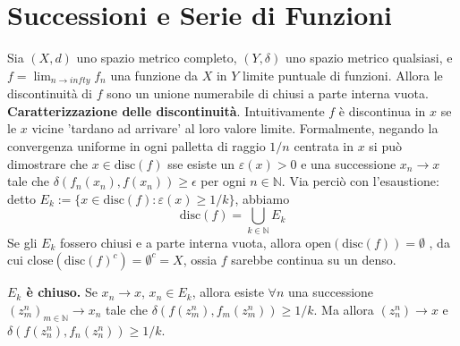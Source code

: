 \section{Successioni e Serie di Funzioni}
 Sia $(X,d)$ uno spazio metrico completo, $(Y, \delta)$ uno spazio metrico qualsiasi, e 
$f= \lim_{n \to infty} f_n$ una funzione da $X$ in $Y$ limite puntuale di funzioni. Allora le discontinuità di $f$ sono 
un unione numerabile di chiusi a parte interna vuota.
\textbf{Caratterizzazione delle discontinuità}. Intuitivamente $f$ è discontinua in $x$ se le $x$ vicine 'tardano ad arrivare' al loro valore limite. Formalmente, negando la convergenza uniforme in ogni palletta di raggio $1/n$ centrata in $x$ si può dimostrare che $x \in \mathrm{disc}(f)$ sse esiste un $\varepsilon(x) > 0$ e una successione $x_n \rightarrow x$ tale che $\delta( f_n(x_n), f(x_n) ) \ge \epsilon$ per ogni $n \in \mathbb{N}$. Via perciò con l'esaustione: detto $E_k := \{x \in \mathrm{disc}(f): \varepsilon(x) \ge 1/k\}$, abbiamo 
$$ \mathrm{disc}(f) = \bigcup_{k \in \mathbb{N}} E_k $$
Se gli $E_k$ fossero chiusi e a parte interna vuota, allora $\mathrm{open} (\mathrm{disc}(f)) = \emptyset$ , 
da cui $\mathrm{close}( \mathrm{disc}(f)^{c} ) = \emptyset^c = X$, ossia $f$ sarebbe continua su un denso.

\textbf{$E_k$ è chiuso.} 
Se $x_n \rightarrow x$, $x_n \in E_k$, allora esiste $\forall n$ una successione \newline 
$(z^n_m )_{m \in \mathbb{N}} \rightarrow x_n$ tale che $\delta(f(z^n_m), f_m(z^n_m) ) \ge 1/k$. \newline
Ma allora $(z^n_n) \rightarrow x$ e $\delta(f(z^n_n), f_n(z^n_n) ) \ge 1/k$. \newline

